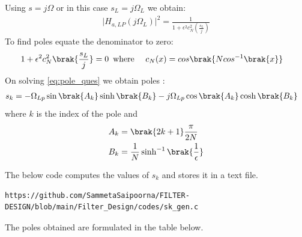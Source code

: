 \documentclass{article}
\begin{document}
\begin{enumerate}
Using $s=j\Omega$ or in this case $s_{L}=j\Omega_{L}$ we obtain:
\begin{align}
    \vert H_{a,LP}(j\Omega_L)\vert^2 = \frac{1}{1 + \epsilon^2c_N^2(\frac{s_L}{j})}
\end{align}
To find poles equate the denominator to zero:
\begin{align}
    {1 + \epsilon^2c_N^2\brak{\frac{s_L}{j}}} &=0\hspace{5pt }
    \text{where } \hspace{10pt} c_N(x) = cos\brak{Ncos^{-1}\brak{x}} \label{eq:pole_ques}
\end{align}
On solving \eqref{eq:pole_ques} we obtain poles :
\begin{align}
    s_{k} &= -\Omega_{Lp} \sin\brak{A_k}\sinh\brak{B_k} - j\Omega_{Lp}\cos\brak{A_k}\cosh\brak{B_k}
\end{align}
where $k$ is the index of the pole and \\
\begin{align}
    A_k &= \brak{2k+1}\frac{\pi}{2N}\\
    B_k &= \frac{1}{N} \sinh^{-1}\brak{\frac{1}{\epsilon}}
\end{align}

The below code computes the values of $s_k$ and stores it in a text file. 
\begin{lstlisting}
https://github.com/SammetaSaipoorna/FILTER-DESIGN/blob/main/Filter_Design/codes/sk_gen.c
\end{lstlisting}
The poles obtained are formulated in the table below.



\end{enumerate}
\end{document}
